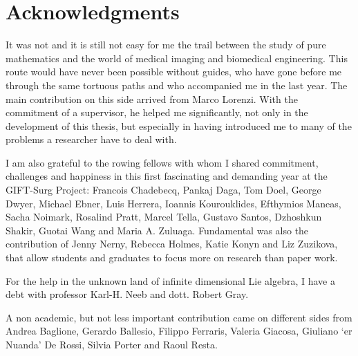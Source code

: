 
\qquad
\pagestyle{empty}
\newpage

\section*{Acknowledgments}
%


It was not and it is still not easy for me the trail between the study of pure mathematics and the world of medical imaging and biomedical engineering. This route would have never been possible without guides, who have gone before me through the same tortuous paths and who accompanied me in the last year. The main contribution on this side arrived from Marco Lorenzi. With the commitment of a supervisor, he helped me significantly, not only in the development of this thesis, but especially in having introduced me to many of the problems a researcher have to deal with.

I am also grateful to the rowing fellows with whom I shared commitment, challenges and happiness in this first fascinating and demanding year at the GIFT-Surg Project: 
Francois Chadebecq, 
Pankaj Daga, 
Tom Doel, 
George Dwyer,
Michael Ebner,
Luis Herrera,
Ioannis Kourouklides,
Efthymios Maneas,
Sacha Noimark,
Rosalind Pratt,
Marcel Tella,
Gustavo Santos,
Dzhoshkun Shakir,
Guotai Wang and Maria A. Zuluaga.
Fundamental was also the contribution of Jenny Nerny, Rebecca Holmes, Katie Konyn and Liz Zuzikova, that allow students and graduates to focus more on research than paper work.

For the help in the unknown land of infinite dimensional Lie algebra, I have a debt with professor Karl-H. Neeb and dott. Robert Gray.

A non academic, but not less important contribution came on different sides from Andrea Baglione, Gerardo Ballesio, Filippo Ferraris, Valeria Giacosa, Giuliano `er Nuanda' De Rossi, Silvia Porter and Raoul Resta. 

